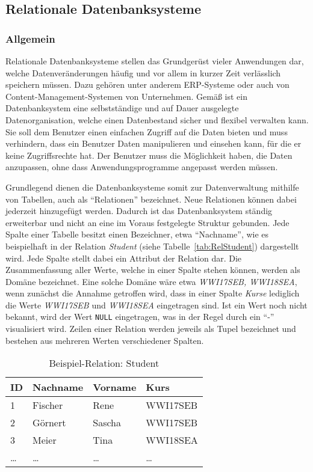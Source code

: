 \subsection{Relationale Datenbanksysteme}
\label{sec:grundlagen:reldb}
\subsubsection{Allgemein}

Relationale Datenbanksysteme stellen das Grundgerüst vieler Anwendungen dar, welche Datenveränderungen häufig und vor allem in kurzer Zeit verlässlich speichern müssen.
Dazu gehören unter anderem \ac{ERP}-Systeme oder auch von Content-Management-Systemen von Unternehmen.
Gemäß \citeauthor{Book_DB_2} ist ein Datenbanksystem eine selbstständige und auf Dauer ausgelegte Datenorganisation, welche einen Datenbestand sicher und flexibel verwalten kann.
Sie soll dem Benutzer einen einfachen Zugriff auf die Daten bieten und muss verhindern, dass ein Benutzer Daten manipulieren und einsehen kann, für die er keine Zugriffsrechte hat.
Der Benutzer muss die Möglichkeit haben, die Daten anzupassen, ohne dass Anwendungsprogramme angepasst werden müssen.\autocite[Vgl.][S. 5 f.]{Book_DB_2}

Grundlegend dienen die Datenbanksysteme somit zur Datenverwaltung mithilfe von Tabellen, auch als \enquote{Relationen} bezeichnet.
Neue Relationen können dabei jederzeit hinzugefügt werden.
Dadurch ist das Datenbanksystem ständig erweiterbar und nicht an eine im Voraus festgelegte Struktur gebunden.
Jede Spalte einer Tabelle besitzt einen Bezeichner, etwa \enquote{Nachname}, wie es beispielhaft in der Relation \emph{Student} (siehe Tabelle~\vref{tab:RelStudent}) dargestellt wird.
Jede Spalte stellt dabei ein Attribut der Relation dar.
Die Zusammenfassung aller Werte, welche in einer Spalte stehen können, werden als Domäne bezeichnet.
Eine solche Domäne wäre etwa \emph{WWI17SEB, WWI18SEA}, wenn zunächst die Annahme getroffen wird, dass in einer Spalte \emph{Kurse} lediglich die Werte \emph{WWI17SEB} und \emph{WWI18SEA} eingetragen sind.
Ist ein Wert noch nicht bekannt, wird der Wert \texttt{NULL} eingetragen, was in der Regel durch ein \enquote{-} visualisiert wird.
Zeilen einer Relation werden jeweils als Tupel bezeichnet und bestehen aus mehreren Werten verschiedener Spalten.\autocite[Vgl.][S. 9 ff.]{Book_DB_2}

\begin{table}
    \centering
    \begin{tabular}[h]{l | l | l | l}
        ID & Nachname & Vorname & Kurs \\ \hline
        1 & Fischer & Rene & WWI17SEB \\
        2 & Görnert & Sascha & WWI17SEB \\
        3 & Meier & Tina & WWI18SEA \\
        \dots & \dots & \dots & \dots \\
        \end{tabular}
        \caption{Beispiel-Relation: Student}
        \label{tab:RelStudent}
\end{table}


